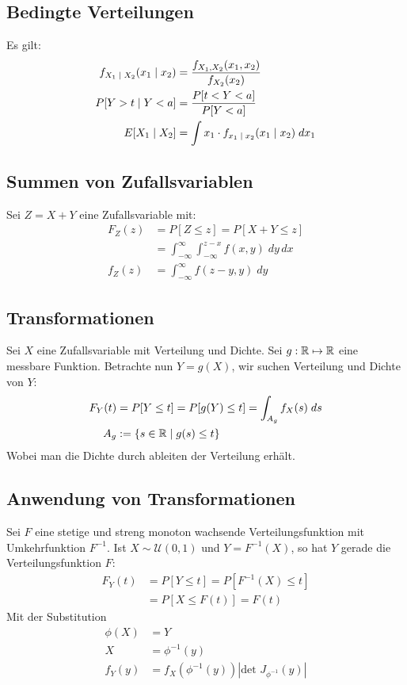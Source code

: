\subsection{Bedingte Verteilungen}
Es gilt:
\begin{align*}
  f_{X_1 \; | \; X_2} (x_1 \; | \; x_2) & = \frac{f_{X_1,  X_2} (x_1,  x_2)}{f_{X_2} (x_2)}              \\
  P[Y > t \; | \; Y < a]                   & = \frac{P[t < Y < a]}{P[Y < a]}                                \\
  E[X_1 \; | \; X_2]                    & = \int x_1 \cdot f_{x_1 \; | \; x_2} (x_1 \; | \; x_2) \; dx_1
\end{align*}
\subsection{Summen von Zufallsvariablen}
Sei $Z = X + Y$ eine Zufallsvariable mit:
\begin{align*}
  F_Z (z) & = P[Z \leq z] = P[X + Y \leq z]                                     \\
          & = \int_{-\infty}^\infty \int_{-\infty}^{z - x} f (x, y )\; dy \, dx \\
  f_Z (z) & = \int_{-\infty}^\infty f (z - y, y) \; dy
\end{align*}
\subsection{Transformationen}
Sei $X$ eine Zufallsvariable mit Verteilung und Dichte. Sei $g: \mathbb{R} \mapsto \mathbb{R}$
eine messbare Funktion. Betrachte nun $Y = g (X)$, wir suchen Verteilung und
Dichte von $Y$:
\begin{align*}
  F_Y (t) & = P[Y \leq t] = P[g (Y) \leq t] = \int_{A_g} f_X (s) \; ds \\
  A_g     & := \{s \in \mathbb{R} \; | \; g (s) \leq t\}
\end{align*}
Wobei man die Dichte durch ableiten der Verteilung erhält.
\subsection{Anwendung von Transformationen}
Sei $F$ eine stetige und streng monoton wachsende Verteilungsfunktion mit
Umkehrfunktion $F^{-1}$. Ist $X \sim \mathcal{U} (0, 1)$ und $Y = F^{-1} (X)$,
so hat $Y$ gerade die Verteilungsfunktion $F$:
\begin{align*}
  F_Y (t) & = P[Y \leq t] = P[F^{-1} (X) \leq t] \\
          & = P[X \leq F (t)] = F (t)
\end{align*}
Mit der Substitution
\begin{align*}
  \phi(X) & = Y                                              \\
  X       & = \phi^{-1}(y)                                   \\
  f_Y(y)  & = f_X(\phi^{-1}(y))|\text{det }J_{\phi^{-1}}(y)| \\
\end{align*}
\BoxStart{}
